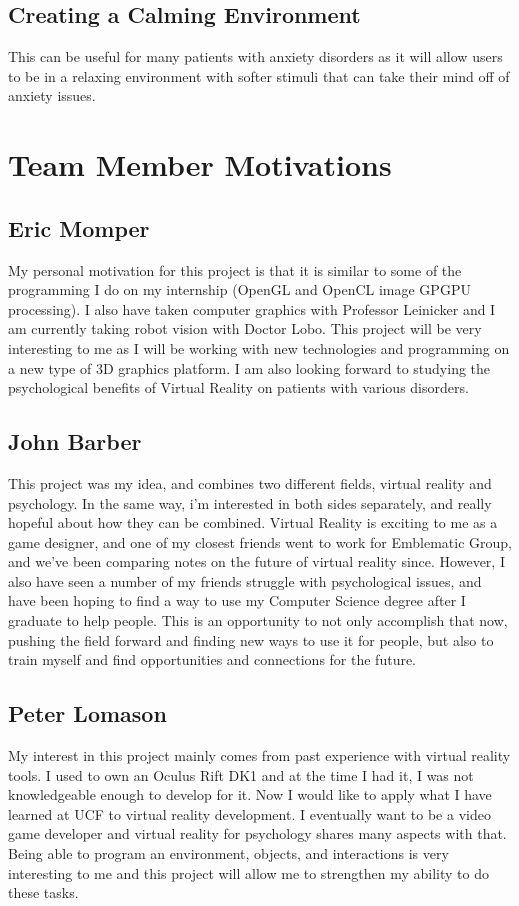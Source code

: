 \documentclass[a4paper,10pt]{article}
\begin{document}
	\subsection{Creating a Calming Environment}
	This can be useful for many patients with anxiety disorders as it will allow users to be in a relaxing environment with softer stimuli that can take their mind off of anxiety issues. 
	\pagebreak
	
	
	\section{Team Member Motivations}
	\subsection{Eric Momper}
	My personal motivation for this project is that it is similar to some of the programming I do on my internship (OpenGL and OpenCL image GPGPU processing).
	I also have taken computer graphics with Professor Leinicker and I am currently taking robot vision with Doctor Lobo. This project will be very interesting to me as  
	I will be working with new technologies and programming on a new type of 3D graphics platform. I am also looking forward to studying the psychological benefits
	of Virtual Reality on patients with various disorders.  
	
	\subsection{John Barber}
	This project was my idea, and combines two different fields, virtual reality and psychology.  In the same way, i'm interested in both 
	sides separately, and really hopeful about how they can be combined.  Virtual Reality is exciting to me as a game designer, 
	and one of my closest friends went to work for Emblematic Group, and we've been comparing notes on the future of virtual reality since.  
	However, I also have seen a number of my friends struggle with psychological issues, and have been hoping to find a way to use my Computer 
	Science degree after I graduate to help people.  This is an opportunity to not only accomplish that now, pushing the field forward and finding 
	new ways to use it for people, but also to train myself and find opportunities and connections for the future.
	\subsection{Peter Lomason}
	My interest in this project mainly comes from past experience with virtual reality tools. I used to own an Oculus Rift DK1 and at the time I had it, 
	I was not knowledgeable enough to develop for it. Now I would like to apply what I have learned at UCF to virtual reality development. I eventually want to be
	a video game developer and virtual reality for psychology shares many aspects with that. Being able to program an environment, objects, and interactions is very
	interesting to me and this project will allow me to strengthen my ability to do these tasks.
\pagebreak
\end{document}
